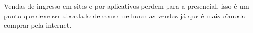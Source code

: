 \documentclass[12pt]{article}
\begin{document}
        \begin{table}[h]
            \centering
            \caption{Meio mais frequente de compra de ingresso}
            \label{table:meio_freq_comp_de_ingresso}
        \end{table}
        \FloatBarrier
        Vendas de ingresso em sites e por aplicativos perdem para a presencial, isso é um ponto que deve ser abordado de como melhorar as vendas já que é mais cômodo comprar pela internet.
\end{document}
